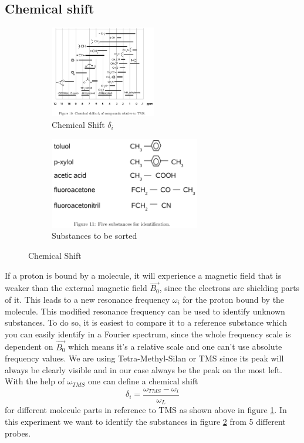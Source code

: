 \subsection{Chemical shift}\label{chemShift}
\begin{figure}[h]
	\begin{subfigure}{0.5\textwidth}
	\centering
	\includegraphics[width=0.9\linewidth ,height=4cm]{images/ChemShift.png}
	\caption{Chemical Shift $\delta_i$}
	\label{shi1}
	\end{subfigure}
	\begin{subfigure}{0.5\textwidth}
	\includegraphics[width=0.7\linewidth ,height=4cm]{images/substances.png}
	\caption{Substances to be sorted}
	\label{shi2}
	\end{subfigure}
	\caption{Chemical Shift}
	\label{shi3}
\end{figure}
If a proton is bound by a molecule, it will experience a magnetic field that is weaker than the external magnetic field $\vec{B_0}$, since the electrons are shielding parts of it. This leads to a new resonance frequency $\omega_i$ for the proton bound by the molecule. This modified resonance frequency can be used to identify unknown substances. To do so, it is easiest to compare it to a reference substance which you can easily identify in a Fourier spectrum, since the whole frequency scale is dependent on $\vec{B_0}$ which means it's a relative scale and one can't use absolute frequency values. We are using Tetra-Methyl-Silan or TMS since its peak will always be clearly visible and in our case always be the peak on the most left. With the help of $\omega_{TMS}$ one can define a chemical shift
\begin{equation}\label{deltashift}
	\delta_i = \frac{\omega_{TMS}-\omega_{i}}{\omega_{L}}
\end{equation} 
for different molecule parts in reference to TMS as shown above in figure \ref{shi1}. In this experiment we want to identify the substances in figure \ref{shi2} from 5 different probes. \\
